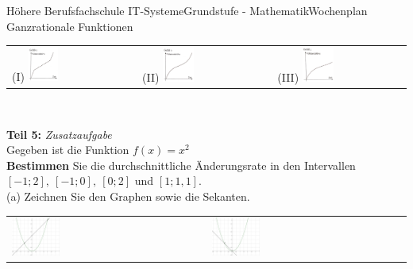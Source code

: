 \documentclass[oneside,openany,headings=optiontotoc,11pt,numbers=noenddot]{scrreprt}
\begin{document}
\begin{worksheet}{Höhere Berufsfachschule IT-Systeme}{Grundstufe - Mathematik}{Wochenplan Ganzrationale Funktionen}
\begin{framed}
\begin{tabularx}{\textwidth}{M|M|M}
				(I) \includegraphics[width=0.25\textwidth]{../99_Bilder/WP/WP12_T4_1.jpg} & (II) \includegraphics[width=0.25\textwidth]{../99_Bilder/WP/WP12_T4_2.png} & (III) \includegraphics[width=0.25\textwidth]{../99_Bilder/WP/WP12_T4_3.png}
			\end{tabularx}\\
		\end{framed}
		\begin{framed}
			\noindent
			\textbf{Teil 5:} \textit{Zusatzaufgabe}\\
			Gegeben ist die Funktion \(f(x) = x^2\)\\
			\textbf{Bestimmen} Sie die durchschnittliche Änderungsrate in den Intervallen \([-1;2],\ [-1;0],\ [0;2]\) und \([1;1,1]\).\\
			(a) Zeichnen Sie den Graphen sowie die Sekanten.\\
			\begin{tabularx}{\textwidth}{M|M}
				\includegraphics[width=0.25\textwidth]{../99_Bilder/WP/WP12_T5_a1.png} & \includegraphics[width=0.25\textwidth]{../99_Bilder/WP/WP12_T5_a2.png}\\

\end{tabularx}
\end{framed}
\end{worksheet}
\end{document}
